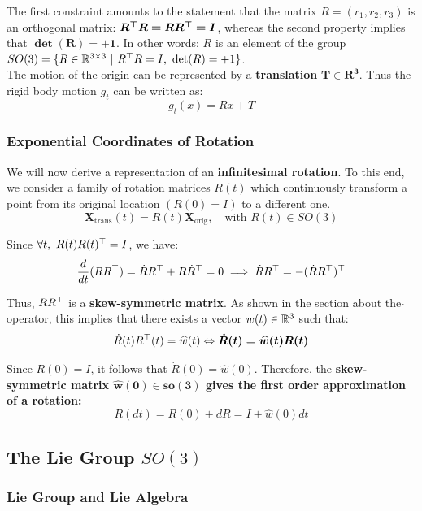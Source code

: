 The first constraint amounts to the statement that the matrix
$R = (r_1, r_2, r_3)$ is an orthogonal matrix: $\bm{R^{\top}R=RR^{\top}=I}$,
whereas the second property implies that $\bm{\det(R) = +1}$.
In other words: $R$ is an element of the group
$SO(3) = \{R \in \mathbb{R}^{3 \times{} 3}\ |\ R^{\top}R=I,\ \det(R) = +1\}$.\\

The motion of the origin can be represented by a \textbf{translation}
$\bm{T \in R^3}$. Thus the rigid body motion $g_t$ can be written as:
	\[g_t(x) = Rx + T\]


\subsubsection{Exponential Coordinates of Rotation}%
\label{ssub:exponential_coordinates_of_rotation}

We will now derive a representation of an \textbf{infinitesimal rotation}.
To this end, we consider a family of rotation matrices $R(t)$
which continuously transform a point from its original location
$(R(0) = I)$ to a different one.
	\[\bm{X}_{\text{trans}}(t) = R(t)\bm{X}_{\text{orig}}, \quad
	\text{with } R(t) \in SO(3)\]

Since $\forall t,\ R(t)R(t)^{\top} = I$, we have:
	\[\frac{d}{dt}(RR^{\top}) = \dot{R}R^{\top} + R\dot{R}^{\top}= 0
	\implies \dot{R}R^{\top} = -( \dot{R}R^{\top} )^{\top}\]

Thus, $\dot{R}R^{\top}$ is a \textbf{skew-symmetric matrix}.
As shown in the section about the $\widehat{}$ operator, this implies that
there exists a vector $w(t) \in \mathbb{R}^3$ such that:
	\[\dot{R}(t)R^{\top}(t) = \widehat{w}(t)
	\Leftrightarrow \bm{ \dot{R}(t) = \widehat{w}(t)R(t)}\]

Since $R(0) = I$, it follows that $\dot{R}(0) = \widehat{w}(0)$.
Therefore, the \textbf{skew-symmetric matrix $\bm{\widehat{w}(0) \in so(3)}$
gives the first order approximation of a rotation:}
	\[R(dt) = R(0) + dR = I + \widehat{w}(0) dt\]


\subsection{The Lie Group $SO(3)$}%
\label{sub:the_lie_group_so_3_}


\subsubsection{Lie Group and Lie Algebra}%
\label{ssub:lie_group_and_lie_algebra}

